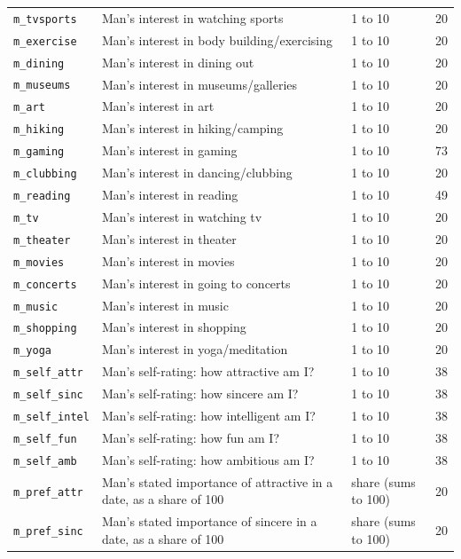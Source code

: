 \documentclass[11pt]{article}
\begin{document}
\begin{longtable}{L{3.3cm}L{8.2cm}L{2.4cm}r}
\texttt{m\_tvsports} & Man's interest in watching sports & 1 to 10 & 20 \\
\texttt{m\_exercise} & Man's interest in body building/exercising & 1 to 10 & 20 \\
\texttt{m\_dining} & Man's interest in dining out & 1 to 10 & 20 \\
\texttt{m\_museums} & Man's interest in museums/galleries & 1 to 10 & 20 \\
\texttt{m\_art} & Man's interest in art & 1 to 10 & 20 \\
\texttt{m\_hiking} & Man's interest in hiking/camping & 1 to 10 & 20 \\
\texttt{m\_gaming} & Man's interest in gaming & 1 to 10 & 73 \\
\texttt{m\_clubbing} & Man's interest in dancing/clubbing & 1 to 10 & 20 \\
\texttt{m\_reading} & Man's interest in reading & 1 to 10 & 49 \\
\texttt{m\_tv} & Man's interest in watching tv & 1 to 10 & 20 \\
\texttt{m\_theater} & Man's interest in theater & 1 to 10 & 20 \\
\texttt{m\_movies} & Man's interest in movies & 1 to 10 & 20 \\
\texttt{m\_concerts} & Man's interest in going to concerts & 1 to 10 & 20 \\
\texttt{m\_music} & Man's interest in music & 1 to 10 & 20 \\
\texttt{m\_shopping} & Man's interest in shopping & 1 to 10 & 20 \\
\texttt{m\_yoga} & Man's interest in yoga/meditation & 1 to 10 & 20 \\
\texttt{m\_self\_attr} & Man's self-rating: how attractive am I? & 1 to 10 & 38 \\
\texttt{m\_self\_sinc} & Man's self-rating: how sincere am I? & 1 to 10 & 38 \\
\texttt{m\_self\_intel} & Man's self-rating: how intelligent am I? & 1 to 10 & 38 \\
\texttt{m\_self\_fun} & Man's self-rating: how fun am I? & 1 to 10 & 38 \\
\texttt{m\_self\_amb} & Man's self-rating: how ambitious am I? & 1 to 10 & 38 \\
\texttt{m\_pref\_attr} & Man's stated importance of attractive in a date, as a share of 100 & share (sums to 100) & 20 \\
\texttt{m\_pref\_sinc} & Man's stated importance of sincere in a date, as a share of 100 & share (sums to 100) & 20 \\

\end{longtable}
\end{document}
